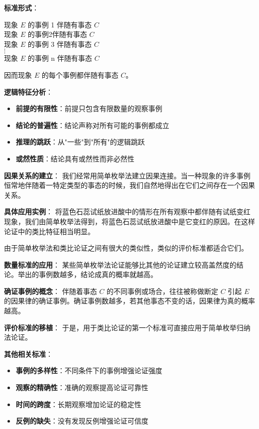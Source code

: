 \begin{theorembox}[title=简单枚举归纳法的形式结构]
\textbf{标准形式}：
\begin{displayquote}
现象 $E$ 的事例 1 伴随有事态 $C$\\
现象 $E$ 的事例2伴随有事态 $C$\\
现象 $E$ 的事例 3 伴随有事态 $C$\\
$\vdots$\\
现象 $E$ 的事例 n 伴随有事态 $C$
\end{displayquote}

因而现象 $E$ 的每个事例都伴随有事态 $C$。

\textbf{逻辑特征分析}：
\begin{itemize}
\item \textbf{前提的有限性}：前提只包含有限数量的观察事例
\item \textbf{结论的普遍性}：结论声称对所有可能的事例都成立
\item \textbf{推理的跳跃}：从"一些"到"所有"的逻辑跳跃
\item \textbf{或然性质}：结论具有或然性而非必然性
\end{itemize}

\textbf{因果关系的建立}：
我们经常用简单枚举法建立因果连接。当一种现象的许多事例恒常地伴随着一特定类型的事态的时候，我们自然地得出在它们之间存在一个因果关系。

\textbf{具体应用实例}：
将蓝色石蕊试纸放进酸中的情形在所有观察中都伴随有试纸变红现象，我们由简单枚举法得到，将蓝色石蕊试纸放进酸中是它变红的原因。在这样论证中的类比特征相当明显。
\end{theorembox}

\begin{theorembox}[title=简单枚举归纳法的评价标准]
由于简单枚举法和类比论证之间有很大的类似性，类似的评价标准都适合它们。

\textbf{数量标准的应用}：
某些简单枚举法论证能够比其他的论证建立较高盖然度的结论。举出的事例数越多，结论成真的概率就越高。

\textbf{确证事例的概念}：
伴随着事态 $C$ 的不同事例或场合，往往被称做断定 $C$ 引起 $E$ 的因果律的确证事例。确证事例数越多，若其他事态不变的话，因果律为真的概率越高。

\textbf{评价标准的移植}：
于是，用于类比论证的第一个标准可直接应用于简单枚举归纳法论证。

\textbf{其他相关标准}：
\begin{itemize}
\item \textbf{事例的多样性}：不同条件下的事例增强论证强度
\item \textbf{观察的精确性}：准确的观察提高论证可靠性
\item \textbf{时间的跨度}：长期观察增加论证的稳定性
\item \textbf{反例的缺失}：没有发现反例增强论证可信度
\end{itemize}
\end{theorembox}

